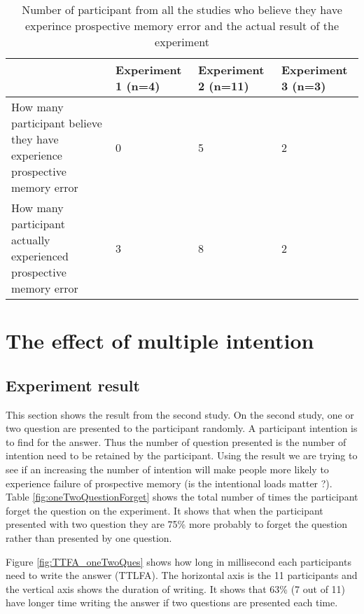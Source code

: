 \begin{table}[]
\centering
\small
\footnotesize
\begin{tabu}{|X[6,l]|X[2,c]|X[2,c]|X[2,c]|}
\hline
                                                                           & Experiment 1 (n=4) & Experiment 2 (n=11) & Experiment 3 (n=3) \\ \hline
How many participant believe they have experience prospective memory error & 0                  & 5                   & 2                  \\ \hline
How many participant actually experienced prospective memory error          & 3                  & 8                   & 2                  \\ \hline
\end{tabu}
\caption{Number of participant from all the studies who believe they have experince prospective memory error and the actual result of the experiment}
\label{fig:affirmationTable}
\end{table}



\section{The effect of multiple intention}

\subsection{Experiment result}
This section shows the result from the second study. On the second study, one or two question are presented to the participant randomly.
A participant intention is to find for the answer. Thus the number of question presented is the number of intention need to be retained by the participant.
Using the result we are trying to see  if an increasing the number of intention will make people more likely to experience failure of prospective memory (is the intentional loads matter ?).
Table \ref{fig:oneTwoQuestionForget} shows the total number of times the participant forget the question on the experiment.
It shows that when the participant presented with two question they are 75\% more probably to forget the
question rather than presented by one question.

Figure \ref{fig:TTFA_oneTwoQues} shows how long in millisecond each participants need to write the answer (TTLFA).
The horizontal axis is the 11 participants and the vertical axis shows the duration of writing.
 It shows that 63\% (7 out of 11) have longer time writing the answer if two questions are presented each time.

